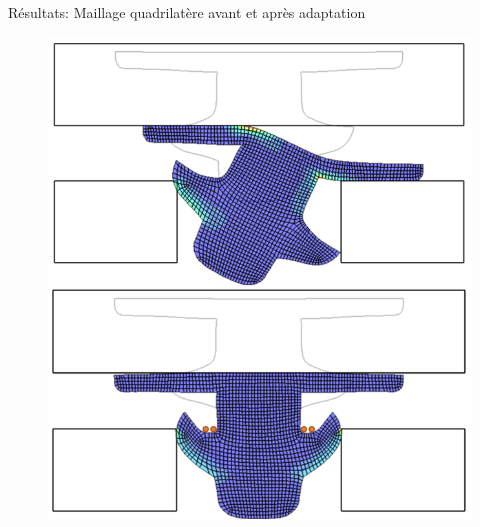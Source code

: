 \begin{frame}{Résultats: Maillage quadrilatère avant et après adaptation}
    \begin{figure}
        \centering
        \includegraphics[width=0.5\linewidth]{img/quadsimu/deformation_same_step.PNG}
    \end{figure}
\end{frame}

